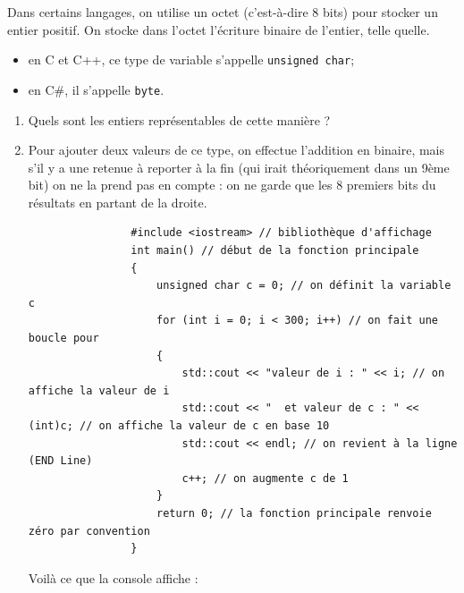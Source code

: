 \begin{exercice}
    Dans certains langages, on utilise un octet (c'est-à-dire 8 bits) pour stocker un entier positif. On stocke dans l'octet l'écriture binaire de l'entier, telle quelle.
    \begin{itemize}
        \item 	en C et C++, ce type de variable s'appelle \texttt{unsigned char};
        \item 	en C\#, il s'appelle \texttt{byte}.
    \end{itemize}
    \begin{enumerate}
        \item 	Quels sont les entiers représentables de cette manière ?
        \item 	Pour ajouter deux valeurs de ce type, on effectue l'addition en binaire, mais s'il y a une retenue à reporter à la fin (qui irait théoriquement dans un 9ème bit) on ne la prend pas en compte : on ne garde que les 8 premiers bits du résultats en partant de la droite.
              
              \begin{verbatim}
                #include <iostream> // bibliothèque d'affichage
                int main() // début de la fonction principale
                {
                    unsigned char c = 0; // on définit la variable c
                    for (int i = 0; i < 300; i++) // on fait une boucle pour
                    {
                        std::cout << "valeur de i : " << i; // on affiche la valeur de i
                        std::cout << "  et valeur de c : " << (int)c; // on affiche la valeur de c en base 10
                        std::cout << endl; // on revient à la ligne (END Line)
                        c++; // on augmente c de 1
                    }
                    return 0; // la fonction principale renvoie zéro par convention
                }
            \end{verbatim}
              Voilà ce que la console affiche :\\
              

\end{enumerate}
\end{exercice}
